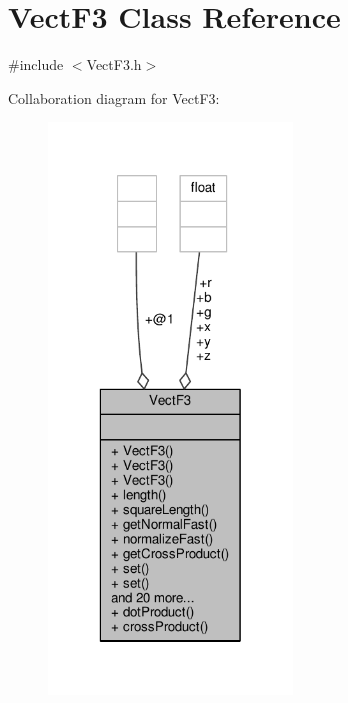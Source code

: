 \hypertarget{classVectF3}{\section{Vect\-F3 Class Reference}
\label{classVectF3}
}


{\ttfamily \#include $<$Vect\-F3.\-h$>$}



Collaboration diagram for Vect\-F3\-:
\nopagebreak
\begin{figure}[H]
\begin{center}
\leavevmode
\includegraphics[width=184pt]{classVectF3__coll__graph}
\end{center}
\end{figure}
